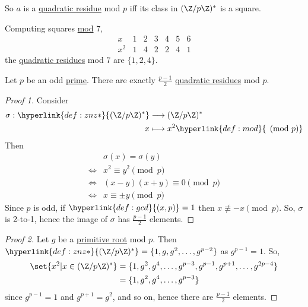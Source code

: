 \documentclass{article}
\begin{document}

So $a$ is a \hyperlink{def:qr}{quadratic residue} mod $p$ iff its class in $(\Z / p \Z)^*$ is a square.
\begin{eg}
    Computing squares \hyperlink{def:mod}{mod} $7$,
    \begin{equation*}
        \begin{array}{c|cccccc}
            x & 1 & 2 & 3 & 4 & 5 & 6 \\ \hline
            x^2 & 1 & 4 & 2 & 2 & 4 & 1
        \end{array}
    \end{equation*}
    the \hyperlink{def:qr}{quadratic residues} mod $7$ are $\{1, 2, 4\}$.
\end{eg}

\begin{nlemma}\label{lem:3.1}
    Let $p$ be an odd \hyperlink{def:prime}{prime}. There are exactly $\frac{p-1}{2}$ \hyperlink{def:qr}{quadratic residues} mod $p$.
\end{nlemma}

\begin{proof}[Proof 1]
    Consider
    \begin{align*}
        \sigma: \hyperlink{def:znz*}{(\Z / p \Z)^*} &\longrightarrow (\Z/p\Z)^* \\
        x &\longmapsto x^2 \hyperlink{def:mod}{\pmod{p}}
    \end{align*}
    Then
    \begin{align*}
        &\sigma(x) = \sigma(y) \\
        \iff &x^2 \equiv y^2 \pmod{p} \\
        \iff &(x-y)(x+y) \equiv 0 \pmod{p} \\
        \iff &x \equiv \pm y \pmod{p}
    \end{align*}
    Since $p$ is odd, if $\hyperlink{def:gcd}{(x, p)} = 1$ then $x \not\equiv -x \pmod{p}$.
    So, $\sigma$ is 2-to-1, hence the image of $\sigma$ has $\frac{p-1}{2}$ elements.
\end{proof}

\begin{proof}[Proof 2]
    Let $g$ be a \hyperlink{def:primRoot}{primitive root} mod $p$.
    Then $\hyperlink{def:znz*}{(\Z / p \Z)^*} = \{1, g, g^2, \dotsc, g^{p-2}\}$ as $g^{p-1} = 1$.
    So,
    \begin{align*}
        \set{x^2 | x \in (\Z / p\Z)^*} &= \{1, g^2, g^4, \dotsc, g^{p-3}, g^{p-1}, g^{p+1}, \dotsc, g^{2p-4}\} \\
                                      &= \{1, g^2, g^4, \dotsc, g^{p-3}\}
    \end{align*}
    since $g^{p-1} = 1$ and $g^{p+1} = g^2$, and so on, hence there are $\frac{p-1}{2}$ elements.
\end{proof}
\end{document}

